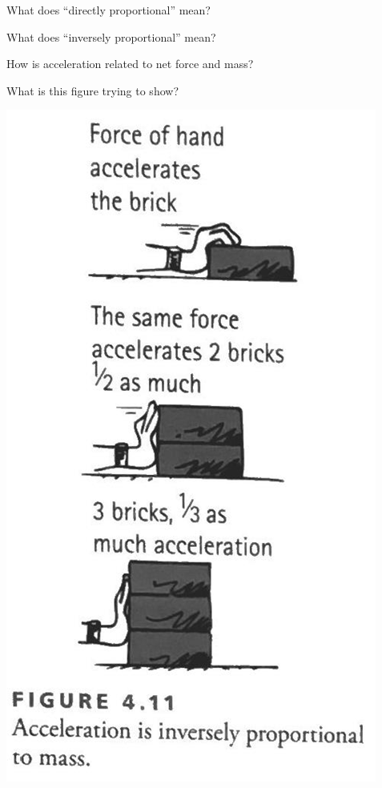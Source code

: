 \documentclass[10pt]{exam}
\begin{document}
\begin{questions}
{}

\question
  What does ``directly proportional'' mean?
  \vs

\question
  What does ``inversely proportional'' mean?
  \vs

\question
  How is acceleration related to net force and mass?
  \vs

\question
  What is this figure trying to show?

  \includegraphics{images/4-11.png}
 
\end{questions}
\end{document}
